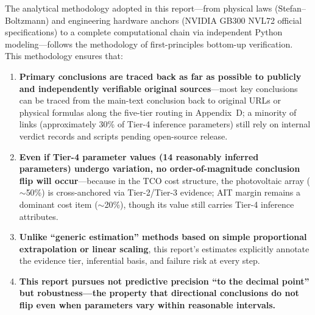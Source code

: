 The analytical methodology adopted in this report---from physical laws (Stefan--Boltzmann) and engineering hardware anchors (NVIDIA GB300 NVL72 official specifications) to a complete computational chain via independent Python modeling---follows the methodology of first-principles bottom-up verification. This methodology ensures that:

\begin{enumerate}[leftmargin=*]
    \item \textbf{Primary conclusions are traced back as far as possible to publicly and independently verifiable original sources}---most key conclusions can be traced from the main-text conclusion back to original URLs or physical formulas along the five-tier routing in Appendix~D; a minority of links (approximately 30\% of Tier-4 inference parameters) still rely on internal verdict records and scripts pending open-source release.
    \item \textbf{Even if Tier-4 parameter values (14 reasonably inferred parameters) undergo variation, no order-of-magnitude conclusion flip will occur}---because in the TCO cost structure, the photovoltaic array ($\sim$50\%) is cross-anchored via Tier-2/Tier-3 evidence; AIT margin remains a dominant cost item ($\sim$20\%), though its value still carries Tier-4 inference attributes.
    \item \textbf{Unlike ``generic estimation'' methods based on simple proportional extrapolation or linear scaling}, this report's estimates explicitly annotate the evidence tier, inferential basis, and failure risk at every step.
    \item \textbf{This report pursues not predictive precision ``to the decimal point'' but robustness---the property that directional conclusions do not flip even when parameters vary within reasonable intervals.}
\end{enumerate}

\endinput

